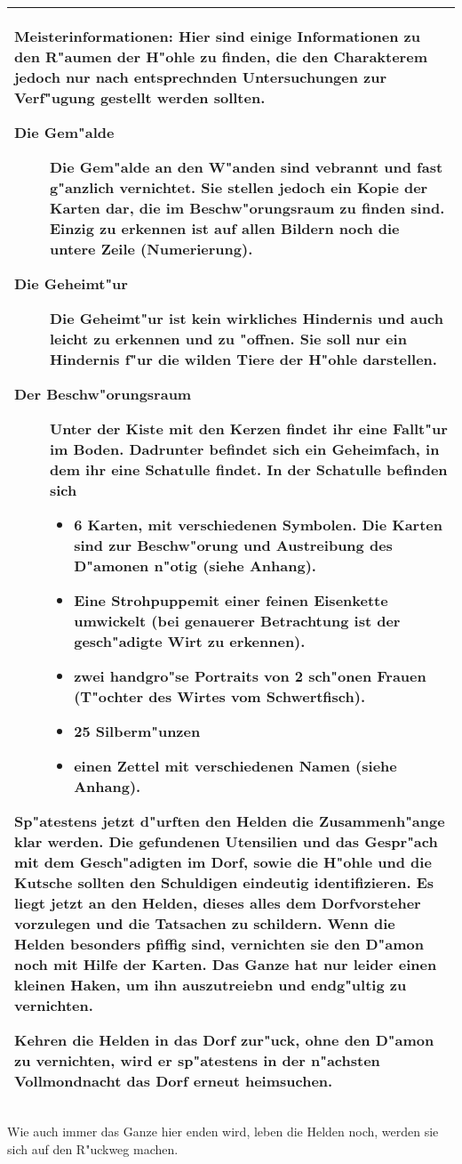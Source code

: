 \begin{longtable}{|p{15cm}|}
\hline
\textbf{Meisterinformationen:} Hier sind einige Informationen zu den R"aumen der H"ohle zu finden, die den Charakterem jedoch nur nach entsprechnden Untersuchungen zur Verf"ugung gestellt werden sollten.
\begin{description}
\item [Die Gem"alde] Die Gem"alde an den W"anden sind vebrannt und fast g"anzlich vernichtet. Sie stellen jedoch ein Kopie der Karten dar, die im Beschw"orungsraum zu finden sind. Einzig zu erkennen ist auf allen Bildern noch die untere Zeile (Numerierung).
\end{description}
\begin{description}
\item [Die Geheimt"ur] Die Geheimt"ur ist kein wirkliches Hindernis und auch leicht zu erkennen und zu "offnen. Sie soll nur ein Hindernis f"ur die wilden Tiere der H"ohle darstellen.
\end{description}
\begin{description}
\item [Der Beschw"orungsraum] Unter der Kiste mit den Kerzen findet ihr eine Fallt"ur im Boden. Dadrunter befindet sich ein Geheimfach, in dem ihr eine Schatulle findet. In der Schatulle befinden sich
	\begin{itemize}
	\item 6 Karten, mit verschiedenen Symbolen. Die Karten sind zur Beschw"orung und Austreibung des D"amonen n"otig
	 (siehe Anhang).
	\item Eine Strohpuppemit einer feinen Eisenkette umwickelt (bei genauerer Betrachtung ist der gesch"adigte Wirt
	zu erkennen).
	\item zwei handgro"se Portraits von 2 sch"onen Frauen (T"ochter des Wirtes vom Schwertfisch).
	\item 25 Silberm"unzen
	\item einen Zettel mit verschiedenen Namen (siehe Anhang).
	\end{itemize}
\end{description}
\par Sp"atestens jetzt d"urften den Helden die Zusammenh"ange klar werden. Die gefundenen Utensilien und das Gespr"ach mit dem Gesch"adigten im Dorf, sowie die H"ohle und die Kutsche sollten den Schuldigen eindeutig identifizieren. Es liegt jetzt an den Helden, dieses alles dem Dorfvorsteher vorzulegen und die Tatsachen zu schildern. Wenn die Helden besonders pfiffig sind, vernichten sie den D"amon noch mit Hilfe der Karten. Das Ganze hat nur leider einen kleinen Haken, um ihn auszutreiebn und endg"ultig zu vernichten.
\par Kehren die Helden in das Dorf zur"uck, ohne den D"amon zu vernichten, wird er sp"atestens in der n"achsten Vollmondnacht das Dorf erneut heimsuchen.\\
\hline
\end{longtable}
\par Wie auch immer das Ganze hier enden wird, leben die Helden noch, werden sie sich auf den R"uckweg machen.